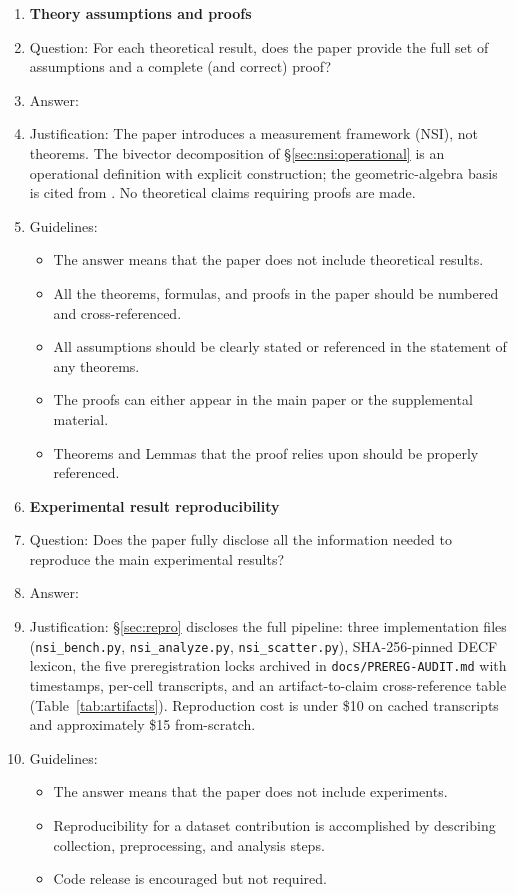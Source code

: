 \begin{enumerate}
\item {\bf Theory assumptions and proofs}
    \item[] Question: For each theoretical result, does the paper provide the full set of assumptions and a complete (and correct) proof?
    \item[] Answer: \answerNA{}
    \item[] Justification: The paper introduces a measurement framework (NSI), not theorems. The bivector decomposition of \S\ref{sec:nsi:operational} is an operational definition with explicit construction; the geometric-algebra basis is cited from \citet{brehmer2023geometric}. No theoretical claims requiring proofs are made.
    \item[] Guidelines:
    \begin{itemize}
        \item The answer \answerNA{} means that the paper does not include theoretical results.
        \item All the theorems, formulas, and proofs in the paper should be numbered and cross-referenced.
        \item All assumptions should be clearly stated or referenced in the statement of any theorems.
        \item The proofs can either appear in the main paper or the supplemental material.
        \item Theorems and Lemmas that the proof relies upon should be properly referenced.
    \end{itemize}

    \item {\bf Experimental result reproducibility}
    \item[] Question: Does the paper fully disclose all the information needed to reproduce the main experimental results?
    \item[] Answer: \answerYes{}
    \item[] Justification: \S\ref{sec:repro} discloses the full pipeline: three implementation files (\texttt{nsi\_bench.py}, \texttt{nsi\_analyze.py}, \texttt{nsi\_scatter.py}), SHA-256-pinned DECF lexicon, the five preregistration locks archived in \texttt{docs/PREREG-AUDIT.md} with timestamps, per-cell transcripts, and an artifact-to-claim cross-reference table (Table~\ref{tab:artifacts}). Reproduction cost is under \$10 on cached transcripts and approximately \$15 from-scratch.
    \item[] Guidelines:
    \begin{itemize}
        \item The answer \answerNA{} means that the paper does not include experiments.
        \item Reproducibility for a dataset contribution is accomplished by describing collection, preprocessing, and analysis steps.
        \item Code release is encouraged but not required.
    \end{itemize}



\end{enumerate}
